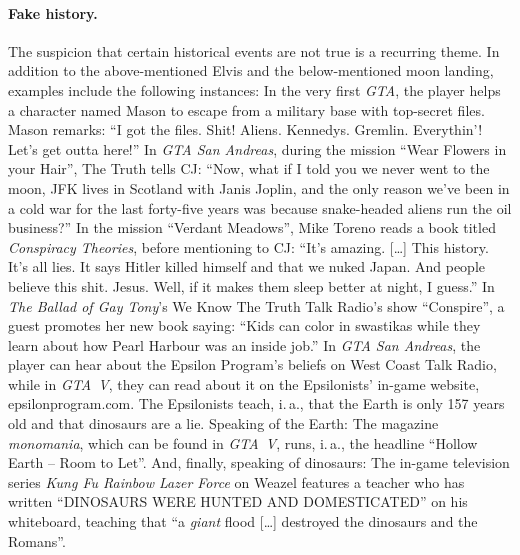 \documentclass[]{scrartcl}
\begin{document}
\paragraph{Fake history.}
The suspicion that certain historical events are not true is a recurring theme.
In addition to the above-mentioned Elvis and the below-mentioned moon landing, examples include the following instances: In the very first \textit{GTA}, the player helps a character named Mason to escape from a military base with top-secret files.
Mason remarks:
\enquote{I got the files.
Shit!
Aliens.
Kennedys.
Gremlin.
Everythin'!
Let's get outta here!}
In \textit{GTA San Andreas}, during the mission \enquote{Wear Flowers in your Hair}, The Truth tells CJ:
\enquote{Now, what if I told you we never went to the moon, JFK lives in Scotland with Janis Joplin, and the only reason we've been in a cold war for the last forty-five years was because snake-headed aliens run the oil business?}
In the mission \enquote{Verdant Meadows}, Mike Toreno reads a book titled \textit{Conspiracy Theories}, before mentioning to CJ:
\enquote{It's amazing. [\dots] This history.
It's all lies.
It says Hitler killed himself and that we nuked Japan.
And people believe this shit.
Jesus.
Well, if it makes them sleep better at night, I guess.}
In \textit{The Ballad of Gay Tony}'s We Know The Truth Talk Radio's show \enquote{Conspire}, a guest promotes her new book saying:
\enquote{Kids can color in swastikas while they learn about how Pearl Harbour was an inside job.}
In \textit{GTA San Andreas}, the player can hear about the Epsilon Program's beliefs on West Coast Talk Radio, while in \textit{GTA~V}, they can read about it on the Epsilonists' in-game website, epsilonprogram.com.
The Epsilonists teach, i.\,a., that the Earth is only 157 years old and that dinosaurs are a lie.
Speaking of the Earth:
The magazine \textit{monomania}, which can be found in \textit{GTA~V}, runs, i.\,a., the headline \enquote{Hollow Earth -- Room to Let}.
And, finally, speaking of dinosaurs:
The in-game television series \textit{Kung Fu Rainbow Lazer Force} on Weazel features a teacher who has written \enquote{DINOSAURS WERE HUNTED AND DOMESTICATED} on his whiteboard, teaching that \enquote{a \textit{giant} flood [\dots] destroyed the dinosaurs and the Romans}.
\end{document}
